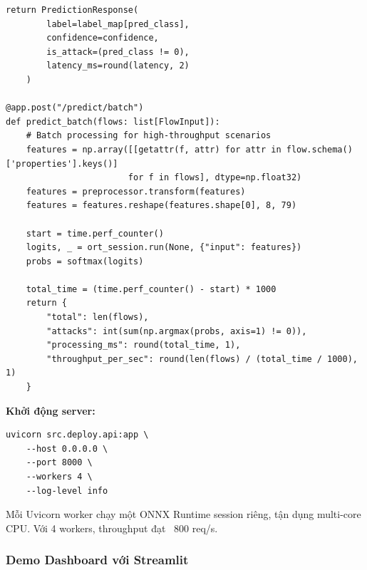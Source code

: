 \documentclass[12pt,a4paper]{article}
\begin{document}
\begin{lstlisting}[caption=FastAPI Backend, label=lst:fastapi]
    return PredictionResponse(
        label=label_map[pred_class],
        confidence=confidence,
        is_attack=(pred_class != 0),
        latency_ms=round(latency, 2)
    )

@app.post("/predict/batch")
def predict_batch(flows: list[FlowInput]):
    # Batch processing for high-throughput scenarios
    features = np.array([[getattr(f, attr) for attr in flow.schema()['properties'].keys()]
                        for f in flows], dtype=np.float32)
    features = preprocessor.transform(features)
    features = features.reshape(features.shape[0], 8, 79)

    start = time.perf_counter()
    logits, _ = ort_session.run(None, {"input": features})
    probs = softmax(logits)

    total_time = (time.perf_counter() - start) * 1000
    return {
        "total": len(flows),
        "attacks": int(sum(np.argmax(probs, axis=1) != 0)),
        "processing_ms": round(total_time, 1),
        "throughput_per_sec": round(len(flows) / (total_time / 1000), 1)
    }
\end{lstlisting}

\textbf{Khởi động server:}
\begin{verbatim}
uvicorn src.deploy.api:app \
    --host 0.0.0.0 \
    --port 8000 \
    --workers 4 \
    --log-level info
\end{verbatim}

Mỗi Uvicorn worker chạy một ONNX Runtime session riêng, tận dụng multi-core CPU. Với 4 workers, throughput đạt ~800 req/s.

\subsubsection{Demo Dashboard với Streamlit}
\end{document}

